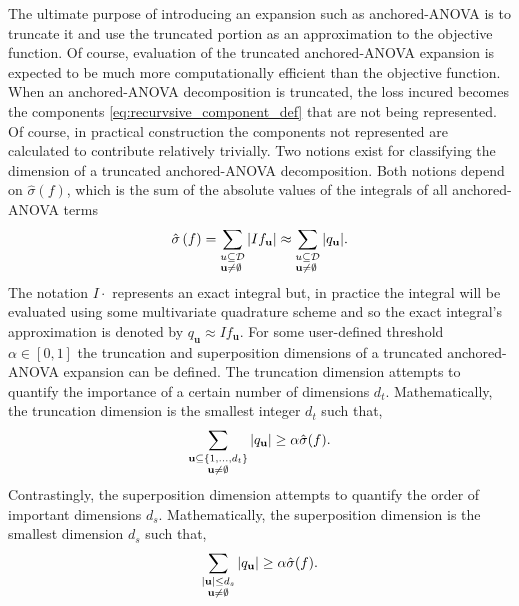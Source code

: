 The ultimate purpose of introducing an expansion such as anchored-\ac{ANOVA} is to truncate it and use the truncated portion as an approximation to the objective function. Of course, evaluation of the truncated anchored-\ac{ANOVA} expansion is expected to be much more computationally efficient than the objective function. When an anchored-\ac{ANOVA} decomposition is truncated, the loss incured becomes the components \ref{eq:recurvsive_component_def} that are not being represented. Of course, in practical construction the components not represented are calculated to contribute relatively trivially. Two notions exist for classifying the dimension of a truncated anchored-\ac{ANOVA} decomposition. Both notions depend on $\hat{\sigma}(f)$, which is the sum of the absolute values of the integrals of all anchored-\ac{ANOVA} terms \cite{Holtz}
\begin{equation} \label{eq:sum_all_integrated_components}
    \hat{\sigma}\left(f\right) = 
     \sum_{\begin{subarray}
     \textbf{u} \subseteq \mathcal{D} \\
     \textbf{u} \neq \emptyset
     \end{subarray}}
      \vert If_\textbf{u} \vert \approx
       \sum_{\begin{subarray}
       \textbf{u} \subseteq \mathcal{D} \\
       \textbf{u} \neq \emptyset
       \end{subarray}}
        \vert q_\textbf{u} \vert .
\end{equation}
The notation $I\cdot$ represents an exact integral but, in practice the integral will be evaluated using some multivariate quadrature scheme and so the exact integral's approximation is denoted by $q_\textbf{u} \approx If_\textbf{u}$. For some user-defined threshold $\alpha \in \left[0,1\right]$ the truncation and superposition dimensions of a truncated anchored-\ac{ANOVA} expansion can be defined. The truncation dimension attempts to quantify the importance of a certain number of dimensions $d_t$. Mathematically, the truncation dimension is the smallest integer $d_t$ such that,
\begin{equation} \label{eq:trunc_dimension}
    \sum_{
     \begin{subarray}{c}
     \textbf{u} \subseteq \lbrace1,...,d_t\rbrace \\
     \textbf{u} \neq \emptyset
     \end{subarray}
    } 
     \vert q_\textbf{u} \vert \geq \alpha \hat{\sigma}(f). \nonumber
\end{equation}
Contrastingly, the superposition dimension attempts to quantify the order of important dimensions $d_s$. Mathematically, the superposition dimension is the smallest dimension $d_s$ such that,
\begin{equation} \label{eq:sup_dimension}
    \sum_{
     \begin{subarray}{c}
     \vert\textbf{u}\vert \leq d_s \\
     \textbf{u} \neq \emptyset
     \end{subarray}
    } 
     \vert q_\textbf{u} \vert \geq \alpha \hat{\sigma}(f). \nonumber
\end{equation}
       
